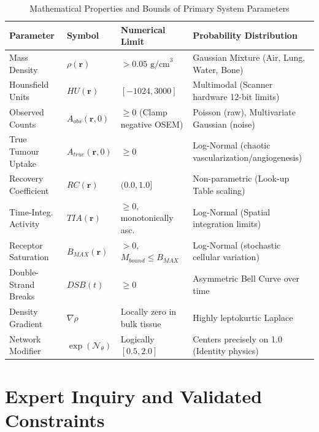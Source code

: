\documentclass[11pt,a4paper]{article}
\begin{document}
\begin{table}[hbt!]
\centering
\caption{Mathematical Properties and Bounds of Primary System Parameters}
\label{tab:parameter_bounds}
\small
\begin{tabularx}{\textwidth}{@{}l l l X@{}}
\toprule
\textbf{Parameter} & \textbf{Symbol} & \textbf{Numerical Limit} & \textbf{Probability Distribution} \\ \midrule
Mass Density & $\rho(\mathbf{r})$ & $> 0.05 \text{ g/cm}^3$ & Gaussian Mixture (Air, Lung, Water, Bone) \\
Hounsfield Units & $HU(\mathbf{r})$ & $[-1024, 3000]$ & Multimodal (Scanner hardware 12-bit limits) \\
Observed Counts & $A_{obs}(\mathbf{r}, 0)$ & $\ge 0$ (Clamp negative OSEM) & Poisson (raw), Multivariate Gaussian (noise) \\
True Tumour Uptake & $A_{true}(\mathbf{r}, 0)$ & $\ge 0$ & Log-Normal (chaotic vascularization/angiogenesis) \\
Recovery Coefficient & $RC(\mathbf{r})$ & $(0.0, 1.0]$ & Non-parametric (Look-up Table scaling) \\
Time-Integ. Activity & $TIA(\mathbf{r})$ & $\ge 0$, monotonically asc. & Log-Normal (Spatial integration limits) \\
Receptor Saturation & $B_{MAX}(\mathbf{r})$ & $> 0$, $M_{bound} \le B_{MAX}$ & Log-Normal (stochastic cellular variation) \\
Double-Strand Breaks & $DSB(t)$ & $\ge 0$ & Asymmetric Bell Curve over time \\
Density Gradient & $\nabla\rho$ & Locally zero in bulk tissue & Highly leptokurtic Laplace \\
Network Modifier & $\exp(\mathcal{N}_\theta)$ & Logically $[0.5, 2.0]$ & Centers precisely on 1.0 (Identity physics) \\
\bottomrule
\end{tabularx}
\end{table}

\section{Expert Inquiry and Validated Constraints}
\end{document}
